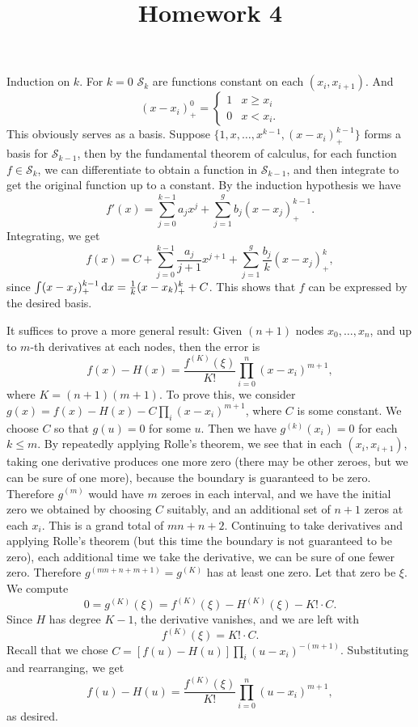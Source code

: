\documentclass{homework}
\title{Homework 4}
\begin{document}
\maketitle

\begin{problem}
Induction on \(k\). For \(k = 0\) \(\mathcal S_k\) are functions constant on each \((x_i, x_{i+1})\). And \[(x - x_i)_+^0 = \begin{cases}
  1 & x \ge x_i\\
  0 & x < x_i.
\end{cases}\]
This obviously serves as a basis. Suppose \(\{1,x,\dots, x^{k-1}, (x-x_i)_+^{k-1}\}\) forms a basis for \(\mathcal S_{k-1}\), then by the fundamental theorem of calculus, for each function \(f \in \mathcal S_{k}\), we can differentiate to obtain a function in \(\mathcal S_{k-1}\), and then integrate to get the original function up to a constant. By the induction hypothesis we have
\[f'(x) = \sum_{j=0}^{k-1} a_j x^j + \sum_{j=1}^g b_j (x-x_j)_+^{k-1}.\]
Integrating, we get
\[f(x) = C + \sum_{j=0}^{k-1} \frac{a_j}{j+1} x^{j+1} + \sum_{j=1}^g \frac{b_j}{k} (x-x_j)_+^{k},\] since \(\int (x-x_j)_+^{k-1} \d[x] = \frac1k (x-x_k)^{k}_+ + C\). This shows that \(f\) can be expressed by the desired basis.
\end{problem}

\begin{problem}
It suffices to prove a more general result: Given \((n+1)\) nodes \(x_0, \dots, x_n\), and up to \(m\)-th derivatives at each nodes, then the error is
\[f(x) - H(x) = \frac{f^{(K)}(\xi)}{K!}\prod_{i=0}^n (x - x_i)^{m+1},\]
where \(K = (n+1)(m+1)\). To prove this, we consider \(g(x) = f(x) - H(x) - C \prod_i (x-x_i)^{m+1}\), where \(C\) is some constant. We choose \(C\) so that \(g(u) = 0\) for some \(u\). Then we have \(g^{(k)}(x_i) = 0\) for each \(k \le m\). By repeatedly applying Rolle's theorem, we see that in each \((x_i, x_{i+1})\), taking one derivative produces one more zero (there may be other zeroes, but we can be sure of one more), because the boundary is guaranteed to be zero. Therefore \(g^{(m)}\) would have \(m\) zeroes in each interval, and we have the initial zero we obtained by choosing \(C\) suitably, and an additional set of \(n+1\) zeros at each \(x_i\). This is a grand total of \(mn + n + 2\). Continuing to take derivatives and applying Rolle's theorem (but this time the boundary is not guaranteed to be zero), each additional time we take the derivative, we can be sure of one fewer zero. Therefore \(g^{(mn + n + m+1)} = g^{(K)}\) has at least one zero. Let that zero be \(\xi\). We compute
\[0 = g^{(K)}(\xi) = f^{(K)}(\xi) - H^{(K)}(\xi) - K! \cdot C.\]
Since \(H\) has degree \(K-1\), the derivative vanishes, and we are left with
\[f^{(K)}(\xi) = K! \cdot C.\]
Recall that we chose \(C = [f(u) - H(u)]\prod_{i}(u-x_i)^{-(m+1)}\). Substituting and rearranging, we get
\[f(u) - H(u) = \frac{f^{(K)}(\xi)}{K!} \prod_{i=0}^n (u - x_i)^{m+1},\]
as desired.
\end{problem}
\end{document}
